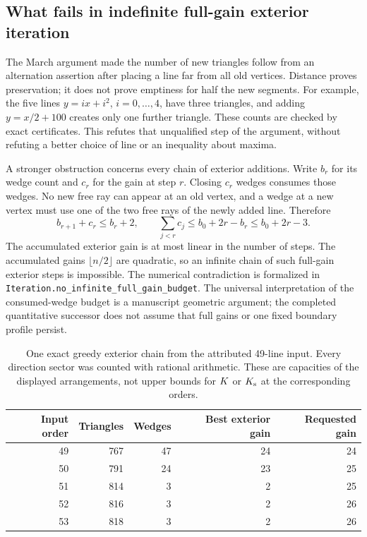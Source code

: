 \subsection{What fails in indefinite full-gain exterior iteration}

The March argument made the number of new triangles follow from an
alternation assertion after placing a line far from all old vertices.
Distance proves preservation; it does not prove emptiness for half the
new segments.  For example, the five lines $y=ix+i^2$, $i=0,\ldots,4$,
have three triangles, and adding $y=x/2+100$ creates only one further
triangle.  These counts are checked by exact certificates.  This refutes
that unqualified step of the argument, without refuting a better choice
of line or an inequality about maxima.

A stronger obstruction concerns every chain of exterior additions.
Write $b_r$ for its wedge count and $c_r$ for the gain at step $r$.
Closing $c_r$ wedges consumes those wedges.  No new free ray can appear
at an old vertex, and a wedge at a new vertex must use one of the two
free rays of the newly added line.  Therefore
\begin{equation}
 b_{r+1}+c_r\leq b_r+2,
 \qquad
 \sum_{j<r}c_j\leq b_0+2r-b_r\leq b_0+2r-3.
 \label{ext:budget}
\end{equation}
The accumulated exterior gain is at most linear in the number of steps.
The accumulated gains $\lfloor n/2\rfloor$ are quadratic, so an infinite
chain of such full-gain exterior steps is impossible.  The numerical
contradiction is formalized in
\texttt{Iteration.no\_infinite\_full\_gain\_budget}. The universal
interpretation of the consumed-wedge budget is a manuscript geometric
argument; the completed quantitative successor does not assume that
full gains or one fixed boundary profile persist.

\begin{table}[tb]
\centering
\small
\begin{tabular}{rrrrr}
\hline
Input order & Triangles & Wedges & Best exterior gain & Requested gain\\
\hline
49&767&47&24&24\\
50&791&24&23&25\\
51&814&3&2&25\\
52&816&3&2&26\\
53&818&3&2&26\\
\hline
\end{tabular}
\caption{One exact greedy exterior chain from the attributed 49-line
input.  Every direction sector was counted with rational arithmetic.
These are capacities of the displayed arrangements, not upper bounds
for $K$ or $K_{\mathrm{s}}$ at the corresponding orders.}
\label{ext:49-table}
\end{table}

